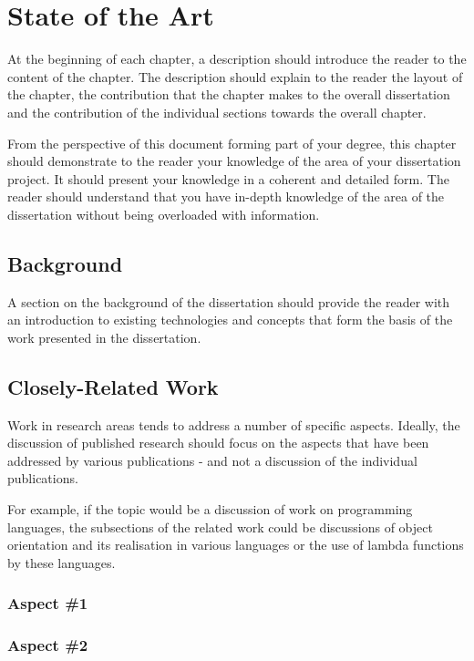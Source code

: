 \chapter{State of the Art}

At the beginning of each chapter, a description should introduce the reader to the content of the chapter. The description should explain to the reader the layout of the chapter, the contribution that the chapter makes to the overall dissertation and the contribution of the individual sections towards the overall chapter.

From the perspective of this document forming part of your degree, this chapter should demonstrate to the reader your knowledge of the area of your dissertation project. It should present your knowledge in a coherent and detailed form. The reader should understand that you have in-depth knowledge of the area of the dissertation without being overloaded with information.

\section{Background}

A section on the background of the dissertation should provide the reader with an introduction to existing technologies and concepts that form the basis of the
work presented in the dissertation.


\section{Closely-Related Work}

Work in research areas tends to address a number of specific aspects. Ideally, the discussion of published research should focus on the aspects that have been addressed by various publications - and not a discussion of the individual publications.

For example, if the topic would be a discussion of work on programming languages, the subsections of the related work could be discussions of object orientation and its realisation in various languages or the use of lambda functions by these languages.

\subsection{Aspect \#1}


\subsection{Aspect \#2}

